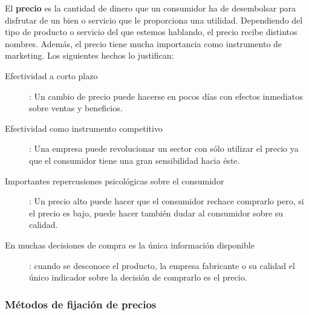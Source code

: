 \documentclass[10pt,a4paper,spanish]{report}
\begin{document}
		El \textbf{precio} es la cantidad de dinero que un consumidor ha de desembolsar para disfrutar de un bien o servicio que le proporciona una utilidad. Dependiendo del tipo de producto o servicio del que estemos hablando, el precio recibe distintos nombres. Además, el precio tiene mucha importancia como instrumento de marketing. Los siguientes hechos lo justifican:
		\begin{description}
			\item[Efectividad a corto plazo]: Un cambio de precio puede hacerse en pocos días con efectos inmediatos sobre ventas y beneficios.

			\item[Efectividad como instrumento competitivo]: Una empresa puede revolucionar un sector con sólo utilizar el precio ya que el consumidor tiene una gran sensibilidad hacia éste.

			\item[Importantes repercusiones psicológicas sobre el consumidor]: Un precio alto puede hacer que el consumidor rechace comprarlo pero, si el precio es bajo, puede hacer también dudar al consumidor sobre su calidad.

			\item[En muchas decisiones de compra es la única información disponible]: cuando se desconoce el producto, la empresa fabricante o  su calidad el único indicador sobre la decisión de comprarlo es el precio.
		\end{description}

	\subsubsection{\textcolor[rgb]{0.1,0.2,0.4}Métodos de fijación de precios}
\end{document}
